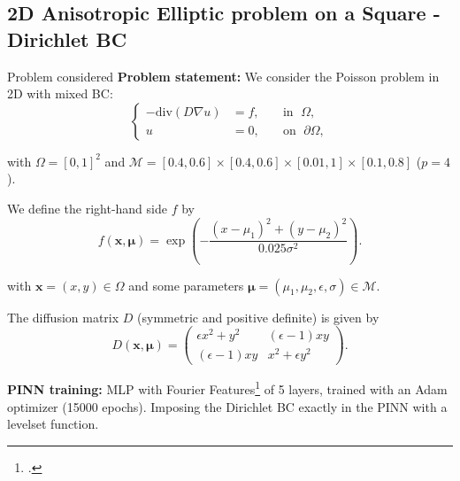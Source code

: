 \subsection{2D Anisotropic Elliptic problem on a Square - Dirichlet BC}

\begin{frame}{Problem considered} 
	\textbf{Problem statement:} We consider the Poisson problem in 2D with mixed BC:
	\vspace{-5pt}
	\begin{equation*}
		\left\{
		\begin{aligned}
			-\text{div}(D\nabla u) & = f, \; &  & \text{in } \; \Omega, \\
			u         & =0, \;  &  & \text{on } \; \partial\Omega,
		\end{aligned}
		\right.
	\end{equation*}

	with $\Omega=[0,1]^2$ and $\mathcal{M}=[0.4, 0.6]\times [0.4, 0.6]\times [0.01,1]\times [0.1,0.8]$ ($p=4$).
		
	\vspace{8pt}
	We define the right-hand side $f$ by
	\vspace{-5pt}
	\begin{equation*}
		f(\bm{x},\bm{\mu})=\exp\left(-\frac{(x-\mu_1)^2+(y-\mu_2)^2}{0.025\sigma^2}\right).
	\end{equation*}

	\vspace{-5pt}
	with $\bm{x}=(x,y)\in\Omega$ and some parameters $\bm{\mu}=(\mu_1,\mu_2,\epsilon,\sigma) \in \mathcal{M}$.
	
	The diffusion matrix $D$ (symmetric and positive definite) is given by
	\begin{equation*}
		D(\bm{x},\bm{\mu})=\begin{pmatrix}
			\epsilon x^2+y^2 & (\epsilon-1)xy \\
			(\epsilon-1)xy & x^2+\epsilon y^2
		\end{pmatrix}.
	\end{equation*}

	\vspace{2pt}
	\textbf{PINN training:} MLP with Fourier Features\footcite{TanSri2020} of 5 layers, trained with an Adam optimizer (15000 epochs). Imposing the Dirichlet BC exactly in the PINN with a levelset function.

	\vspace{5pt}
\end{frame}

